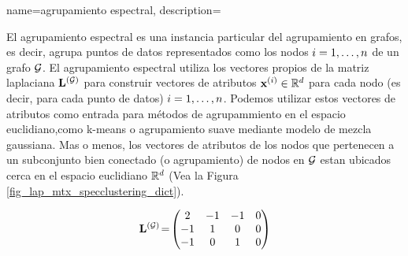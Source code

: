 {name={agrupamiento espectral},
	description={El agrupamiento espectral  es una instancia particular del 
		agrupamiento en grafos, es decir, agrupa puntos de datos
		representados como los nodos $i=1,\ldots,n$ de un grafo $\mathcal{G}$. 
		El agrupamiento espectral utiliza los vectores propios de la matriz laplaciana ${\bf L}^{(\mathcal{G})}$ 
		para construir vectores de atributos ${\bf x}^{(i)} \in \mathbb{R}^{d}$ 
		para cada nodo (es decir, para cada punto de datos) $i=1,\ldots,n$. Podemos utilizar estos vectores de atributos 
		como entrada para métodos de agrupammiento en el espacio euclidiano,como k-means
		o agrupamiento suave mediante modelo de mezcla gaussiana. Mas o menos, los vectores de atributos de los nodos 
		que pertenecen a un subconjunto bien conectado (o agrupamiento) de nodos en $\mathcal{G}$ estan ubicados 
		cerca en el espacio euclidiano $\mathbb{R}^{d}$ (Vea la Figura \ref{fig_lap_mtx_specclustering_dict}). 
		\begin{figure}[H]
			\begin{center}
				\begin{minipage}{0.4\textwidth}
				\end{minipage} 
				\hspace*{5mm}
				\begin{minipage}{0.4\textwidth}
					\begin{equation} 
						{\bf L}^{(\mathcal{G})}\!=\!
						\begin{pmatrix} 
							2 & -1 & -1 & 0 \\ 
							-1 & 1 & 0 & 0 \\  
							-1 & 0 & 1 & 0 \\ 

\end{pmatrix}
\end{equation}
\end{minipage}
\end{center}
\end{figure}}}

